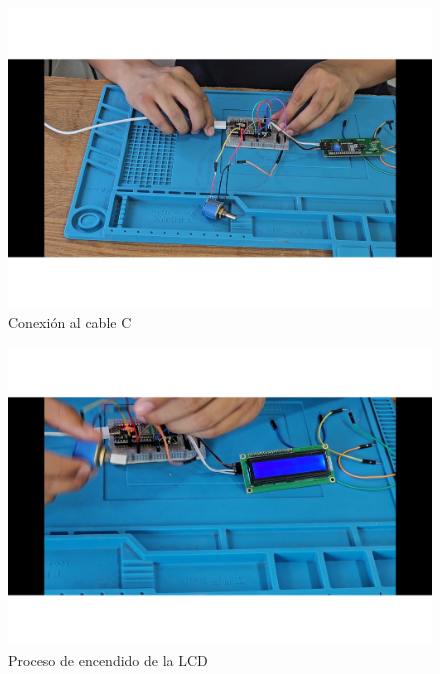     
    \begin{figure}[H]
        \centering
        \includegraphics[trim = {25mm 25mm 25mm 10mm},clip,scale=0.3]{22/Img/e10.pdf}
        \caption{Conexión al cable C}
        \label{fig:evi4}
    \end{figure}
    
    
    \begin{figure}[H]
        \centering
        \includegraphics[trim =  {25mm 25mm 25mm 10mm},clip,scale=0.3]{22/Img/e12.pdf}
        \caption{Proceso de encendido de la LCD}
        \label{fig:evi5}
    \end{figure}
    
